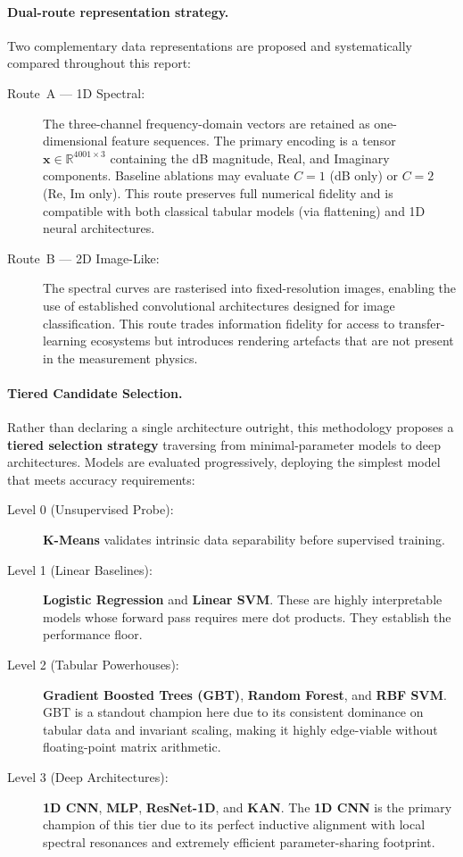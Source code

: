 \paragraph{Dual-route representation strategy.}
Two complementary data representations are proposed and systematically
compared throughout this report:
\begin{description}
    \item[Route~A --- 1D Spectral:]  The three-channel frequency-domain vectors
        are retained as one-dimensional feature sequences.  The primary encoding
        is a tensor $\mathbf{x} \in \mathbb{R}^{4001 \times 3}$ containing the
        dB magnitude, Real, and Imaginary components.  Baseline ablations may
        evaluate $C=1$ (dB only) or $C=2$ (Re, Im only).  This route preserves
        full numerical fidelity and is compatible with both classical tabular
        models (via flattening) and 1D neural architectures.
    \item[Route~B — 2D Image-Like:]  The spectral curves are rasterised
        into fixed-resolution images, enabling the use of established
        convolutional architectures designed for image classification.
        This route trades information fidelity for access to
        transfer-learning ecosystems but introduces rendering artefacts
        that are not present in the measurement physics.
\end{description}

\paragraph{Tiered Candidate Selection.}
Rather than declaring a single architecture outright, this methodology proposes a
\textbf{tiered selection strategy} traversing from minimal-parameter models to
deep architectures. Models are evaluated progressively, deploying the simplest
model that meets accuracy requirements:

\begin{description}
    \item[Level 0 (Unsupervised Probe):] \textbf{K-Means} validates intrinsic
        data separability before supervised training.
    \item[Level 1 (Linear Baselines):] \textbf{Logistic Regression} and
        \textbf{Linear SVM}. These are highly interpretable models whose forward
        pass requires mere dot products. They establish the performance floor.
    \item[Level 2 (Tabular Powerhouses):] \textbf{Gradient Boosted Trees (GBT)},
        \textbf{Random Forest}, and \textbf{RBF SVM}. GBT is a standout champion
        here due to its consistent dominance on tabular data and invariant scaling,
        making it highly edge-viable without floating-point matrix arithmetic.
    \item[Level 3 (Deep Architectures):] \textbf{1D CNN}, \textbf{MLP},
        \textbf{ResNet-1D}, and \textbf{KAN}. The \textbf{1D CNN} is the primary
        champion of this tier due to its perfect inductive alignment with local
        spectral resonances and extremely efficient parameter-sharing footprint.
\end{description}

